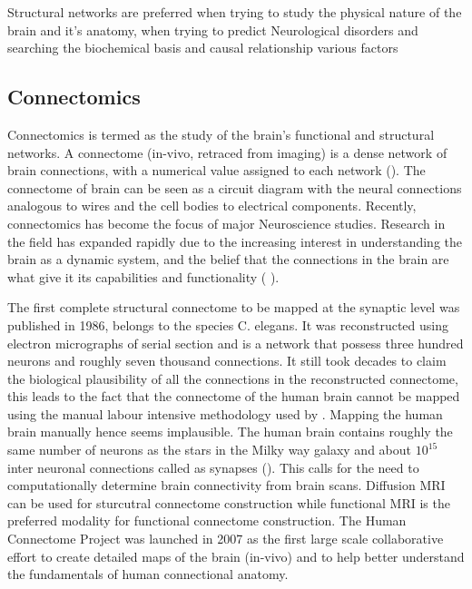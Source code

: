 \documentclass[msthesis.tex]{subfiles}
\begin{document}
Structural networks are preferred when trying to study the physical nature of the brain and it's anatomy, when trying to predict Neurological disorders and searching the biochemical basis and causal relationship various factors

\subsection{Connectomics}
\label{sec:connectomics}
Connectomics is termed as the study of the brain's functional and structural networks. A connectome (in-vivo, retraced from imaging) is a dense network of brain connections, with a numerical value assigned to each network (\cite{bassett2017network}). The connectome of brain can be seen as a circuit diagram with the neural connections analogous to wires and the cell bodies to electrical components.
Recently, connectomics has become the focus of major Neuroscience studies. Research in the field has expanded rapidly due to the increasing interest in understanding the brain as a dynamic system, and the belief that the connections in the brain are what give it its capabilities and functionality ( \cite{network_neuroscience_editorial}).

The first complete structural connectome to be mapped at the synaptic level was published in 1986,  belongs to the species C. elegans. It was reconstructed using electron micrographs of serial section and is a network that possess three hundred neurons and roughly seven thousand connections. It still took decades to claim the biological plausibility of all the connections in the reconstructed connectome\cite{elegans}, this leads to the fact that the connectome of the human brain cannot be mapped using the manual labour intensive methodology used by \cite{white1986structure}. Mapping the human brain manually hence seems implausible. The human brain contains roughly the same number of neurons as the stars in the Milky way galaxy and about $10^{15}$ inter neuronal connections called as synapses (\cite{fornito2015connectomics}). This calls for the need to computationally determine brain connectivity from brain scans. Diffusion MRI can be used for sturcutral connectome construction while functional MRI is the preferred modality for functional connectome construction. The Human Connectome Project was launched in 2007 as the first large scale collaborative effort to create detailed maps of the brain (in-vivo) and to help better understand the fundamentals of human connectional anatomy.
\end{document}
